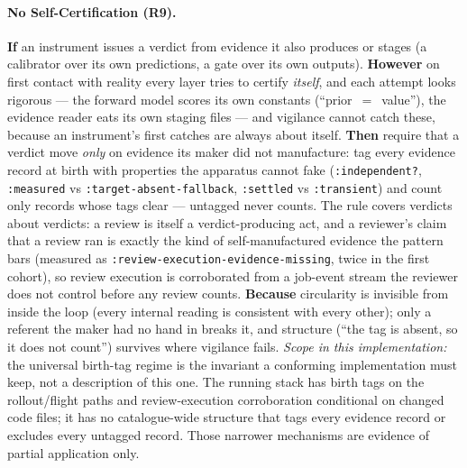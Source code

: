 \paragraph{No Self-Certification (R9).\apparatusmark{}} \textbf{If} an instrument issues a verdict from evidence it also produces or stages (a calibrator over its own predictions, a gate over its own outputs). \textbf{However} on first contact with reality every layer tries to certify \emph{itself}, and each attempt looks rigorous --- the forward model scores its own constants (``prior~$=$~value''), the evidence reader eats its own staging files --- and vigilance cannot catch these, because an instrument's first catches are always about itself. \textbf{Then} require that a verdict move \emph{only} on evidence its maker did not manufacture: tag every evidence record at birth with properties the apparatus cannot fake (\texttt{:independent?}, \texttt{:measured} vs \texttt{:target-absent-fallback}, \texttt{:settled} vs \texttt{:transient}) and count only records whose tags clear --- untagged never counts.  The rule covers verdicts about verdicts: a review is
itself a verdict-producing act, and a reviewer's claim that a review ran is
exactly the kind of self-manufactured evidence the pattern bars (measured as
\texttt{:review-execution-evidence-missing}, twice in the first cohort), so
review execution is corroborated from a job-event stream the reviewer does
not control before any review counts. \textbf{Because} circularity is invisible from inside the loop (every internal reading is consistent with every other); only a referent the maker had no hand in breaks it, and structure (``the tag is absent, so it does not count'') survives where vigilance fails.  \emph{Scope in this implementation:} the universal birth-tag regime is the invariant a conforming implementation must keep, not a description of this one.  The running stack has birth tags on the rollout/flight paths and review-execution corroboration conditional on changed code files; it has no catalogue-wide structure that tags every evidence record or excludes every untagged record.  Those narrower mechanisms are evidence of partial application only.

